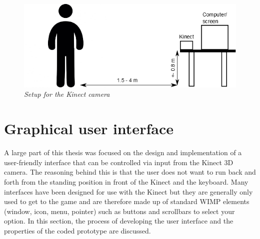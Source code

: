 \begin{figure}[H]
\begin{center}
\includegraphics[width=12cm]{SetupKinect.png}
\caption{\emph{Setup for the Kinect camera}}
\label{fig: kinect_setup}
\end{center}
\end{figure}



\section{Graphical user interface}

A large part of this thesis was focused on the design and implementation of a user-friendly interface that can be controlled via input from the Kinect 3D camera. The reasoning behind this is that the user does not want to run back and forth from the standing position in front of the Kinect and the keyboard. Many interfaces have been designed for use with the Kinect but they are generally only used to get to the game and are therefore made up of standard WIMP elements (window, icon, menu, pointer) such as buttons and scrollbars to select your option. In this section, the process of developing the user interface and the properties of the coded prototype are discussed.\\

